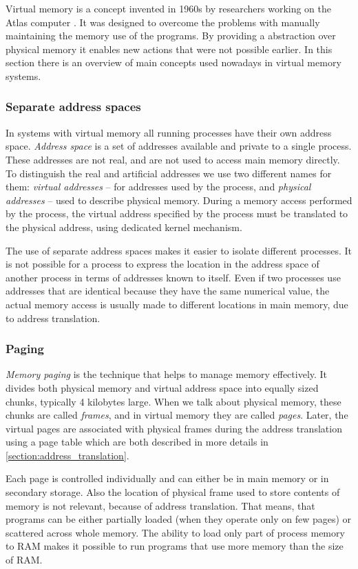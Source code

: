 Virtual memory is a concept invented in 1960s by researchers working on the Atlas computer \cite{denning}.
It was designed to overcome the problems with manually maintaining the memory use of the programs.
By providing a abstraction over physical memory it enables new actions that were not possible earlier.
In this section there is an overview of main concepts used nowadays in virtual memory systems.

\subsubsection{Separate address spaces}

In systems with virtual memory all running processes have their own address space.
{\it Address space} is a set of addresses available and private to a single process.
These addresses are not real, and are not used to access main memory directly.
To distinguish the real and artificial addresses we use two different names for them: {\it virtual addresses} -- for addresses used by the process, and
{\it physical addresses} -- used to describe physical memory.
During a memory access performed by the process, the virtual address specified by the process must be translated to the physical address,
using dedicated kernel mechanism.

The use of separate address spaces makes it easier to isolate different processes.
It is not possible for a process to express the location in the address space of another process in terms of addresses known to itself.
Even if two processes use addresses that are identical because they have the same numerical value, the actual memory access is usually made
to different locations in main memory, due to address translation.

\subsubsection{Paging}

{\it Memory paging} is the technique that helps to manage memory effectively.
It divides both physical memory and virtual address space into equally sized chunks, typically 4 kilobytes large.
When we talk about physical memory, these chunks are called {\it frames}, and in virtual memory they are called {\it pages}.
Later, the virtual pages are associated with physical frames during the address translation using a page table which are both described in more details in \ref{section:address_translation}.

Each page is controlled individually and can either be in main memory or in secondary storage.
Also the location of physical frame used to store contents of memory is not relevant, because of address translation.
That means, that programs can be either partially loaded (when they operate only on few pages) or scattered across whole memory.
The ability to load only part of process memory to RAM makes it possible to run programs that use more memory than the size of RAM.

